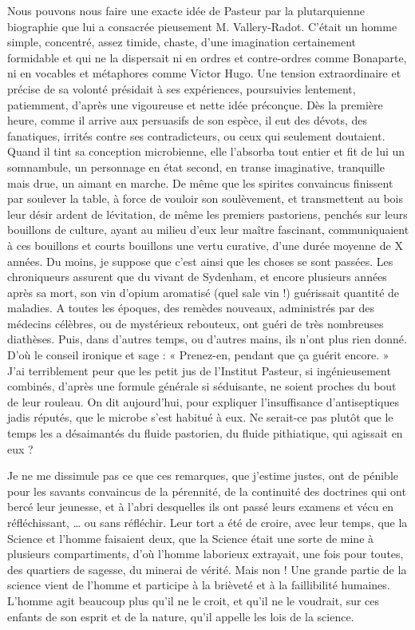 \documentclass[french,twoside]{book} %
\begin{document}
Nous pouvons nous faire une exacte idée de Pasteur par la plutarquienne biographie que lui a consacrée pieusement M. Vallery-Radot. C’était un homme simple, concentré, assez timide, chaste, d’une imagination certainement formidable et qui ne la dispersait ni en ordres et contre-ordres comme Bonaparte, ni en vocables et métaphores comme Victor Hugo. Une tension extraordinaire et précise de sa volonté présidait à ses expériences, poursuivies lentement, patiemment, d’après une vigoureuse et nette idée préconçue. Dès la première heure, comme il arrive aux persuasifs de son espèce, il eut des dévots, des fanatiques, irrités contre ses contradicteurs, ou ceux qui seulement doutaient. Quand il tint sa conception microbienne, elle l’absorba tout entier et fit de lui un somnambule, un personnage en état second, en transe imaginative, tranquille mais drue, un aimant en marche. De même que les spirites convaincus finissent par soulever la table, à force de vouloir son soulèvement, et transmettent au bois leur désir ardent de lévitation, de même les premiers pastoriens, penchés sur leurs bouillons de culture, ayant au milieu d’eux leur maître fascinant, communiquaient à ces bouillons et courts bouillons une vertu curative, d’une durée moyenne de X années. Du moins, je suppose que c’est ainsi que les choses se sont passées. Les chroniqueurs assurent que du vivant de Sydenham, et encore plusieurs années après sa mort, son vin d’opium aromatisé (quel sale vin !) guérissait quantité de maladies. A toutes les époques, des remèdes nouveaux, administrés par des médecins célèbres, ou de mystérieux rebouteux, ont guéri de très nombreuses diathèses. Puis, dans d’autres temps, ou d’autres mains, ils n’ont plus rien donné. D’où le conseil ironique et sage : « Prenez-en, pendant que ça guérit encore. » J’ai terriblement peur que les petit jus de l’Institut Pasteur, si ingénieusement combinés, d’après une formule générale si séduisante, ne soient proches du bout de leur rouleau. On dit aujourd’hui, pour expliquer l’insuffisance d’antiseptiques jadis réputés, que le microbe s’est habitué à eux. Ne serait-ce pas plutôt que le temps les a désaimantés du fluide pastorien, du fluide pithiatique, qui agissait en eux ?\par
Je ne me dissimule pas ce que ces remarques, que j’estime justes, ont de pénible pour les savants convaincus de la pérennité, de la continuité des doctrines qui ont bercé leur jeunesse, et à l’abri desquelles ils ont passé leurs examens et vécu en réfléchissant, … ou sans réfléchir. Leur tort a été de croire, avec leur temps, que la Science et l’homme faisaient deux, que la Science était une sorte de mine à plusieurs compartiments, d’où l’homme laborieux extrayait, une fois pour toutes, des quartiers de sagesse, du minerai de vérité. Mais non ! Une grande partie de la science vient de l’homme et participe à la brièveté et à la faillibilité humaines. L’homme agit beaucoup plus qu’il ne le croit, et qu’il ne le voudrait, sur ces enfants de son esprit et de la nature, qu’il appelle les lois de la science.\par
\end{document}
